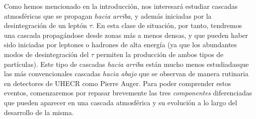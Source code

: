 \documentclass[12 pt, a4paper]{article} %
\numberwithin{equation}{section}
\numberwithin{figure}{section}
\numberwithin{table}{section}
\begin{document}
Como hemos mencionado en la introducción, nos interesará estudiar cascadas atmosféricas que se propagan \textit{hacia arriba}, y además iniciadas por la desintegración de un leptón $\tau$. En esta clase de situación, por tanto, tendremos una cascada propagándose desde zonas más a menos densas, y que pueden haber sido iniciadas por leptones o hadrones de alta energía (ya que los abundantes modos de desintegración del $\tau$ permiten la producción de ambos tipos de partículas). Este tipo de cascadas \textit{hacia arriba} están mucho menos estudiadasque las más convencionales cascadas \textit{hacia abajo} que se observan de manera rutinaria en detectores de UHECR como Pierre Auger. Para poder comprender estos eventos, comenzaremos por repasar brevemente las tres \textit{componentes} diferenciadas que pueden aparecer en una cascada atmosférica y su evolución a lo largo del desarrollo de la misma.
\end{document}
